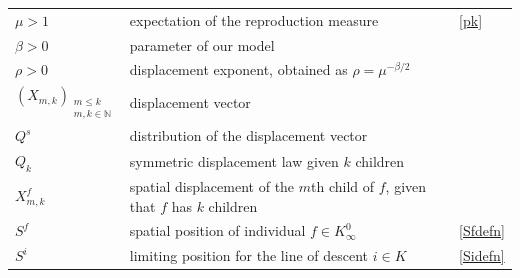 \documentclass[12pt]{article}
\numberwithin{theorem}{section}
\theoremstyle{def}
\numberwithin{equation}{section}
\newcommand{\N}{\mathbb{N}}
\begin{document}
{\begin{center}
\begin{longtable}{|l|l|l|}
		$\mu>1$  & expectation of the reproduction measure & \eqref{pk}\\
		$\beta>0$  & parameter of our model& \\
		$\rho>0$  & displacement exponent, obtained as $\rho =\mu^{-\beta/2}$& \\
		\hline
		$\left(X_{m,k}\right)_{\substack{m\le k \\ 
				m,k\in \N }}$ &   displacement vector & \\
		$Q^s$  & distribution of the displacement vector& \\
		$Q_k$ & symmetric displacement law given $k$ children & \\
		$X_{m,k}^f$ & spatial displacement of the $m$th child of $f$, given that $f$ has $k$ children& \\
		$S^f$  & spatial position of individual $f\in K_\infty^0$& \eqref{Sfdefn}\\
		$S^i$  & limiting position for the line of descent $i\in K$& \eqref{Sidefn}\\
		

\end{longtable}
\end{center}}
\end{document}
